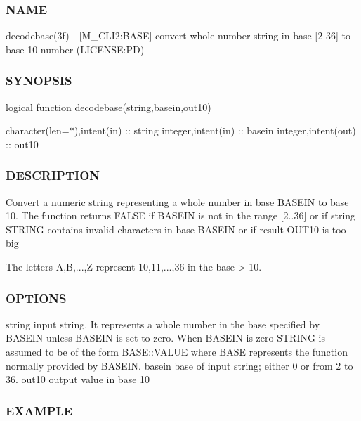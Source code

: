 \subsubsection*{N\+A\+ME}

decodebase(3f) -\/ \mbox{[}M\+\_\+\+C\+L\+I2\+:B\+A\+SE\mbox{]} convert whole number string in base \mbox{[}2-\/36\mbox{]} to base 10 number (L\+I\+C\+E\+N\+SE\+:PD)

\subsubsection*{S\+Y\+N\+O\+P\+S\+IS}

logical function decodebase(string,basein,out10)

character(len=$\ast$),intent(in) \+:\+: string integer,intent(in) \+:\+: basein integer,intent(out) \+:\+: out10 \subsubsection*{D\+E\+S\+C\+R\+I\+P\+T\+I\+ON}

\begin{DoxyVerb}Convert a numeric string representing a whole number in base BASEIN
to base 10. The function returns FALSE if BASEIN is not in the range
[2..36] or if string STRING contains invalid characters in base BASEIN
or if result OUT10 is too big

The letters A,B,...,Z represent 10,11,...,36 in the base > 10.
\end{DoxyVerb}


\subsubsection*{O\+P\+T\+I\+O\+NS}

string input string. It represents a whole number in the base specified by B\+A\+S\+E\+IN unless B\+A\+S\+E\+IN is set to zero. When B\+A\+S\+E\+IN is zero S\+T\+R\+I\+NG is assumed to be of the form B\+A\+S\+E\+::\+V\+A\+L\+UE where B\+A\+SE represents the function normally provided by B\+A\+S\+E\+IN. basein base of input string; either 0 or from 2 to 36. out10 output value in base 10

\subsubsection*{E\+X\+A\+M\+P\+LE}

